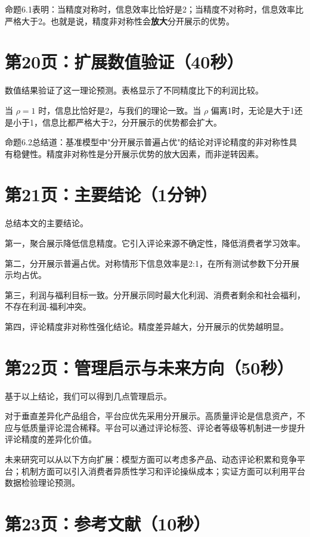 \documentclass[12pt,a4paper]{article}
\begin{document}
命题6.1表明：当精度对称时，信息效率比恰好是2；当精度不对称时，信息效率比严格大于2。也就是说，精度非对称性会\textbf{放大}分开展示的优势。

\section*{第20页：扩展数值验证（40秒）}

数值结果验证了这一理论预测。表格显示了不同精度比下的利润比较。

当 $\rho = 1$ 时，信息比恰好是2，与我们的理论一致。当 $\rho$ 偏离1时，无论是大于1还是小于1，信息比都严格大于2，分开展示的优势都会扩大。

命题6.2总结道：基准模型中"分开展示普遍占优"的结论对评论精度的非对称性具有稳健性。精度非对称性是分开展示优势的放大因素，而非逆转因素。

\section*{第21页：主要结论（1分钟）}

总结本文的主要结论。

第一，聚合展示降低信息精度。它引入评论来源不确定性，降低消费者学习效率。

第二，分开展示普遍占优。对称情形下信息效率是2:1，在所有测试参数下分开展示均占优。

第三，利润与福利目标一致。分开展示同时最大化利润、消费者剩余和社会福利，不存在利润-福利冲突。

第四，评论精度非对称性强化结论。精度差异越大，分开展示的优势越明显。

\section*{第22页：管理启示与未来方向（50秒）}

基于以上结论，我们可以得到几点管理启示。

对于垂直差异化产品组合，平台应优先采用分开展示。高质量评论是信息资产，不应与低质量评论混合稀释。平台可以通过评论标签、评论者等级等机制进一步提升评论精度的差异化价值。

未来研究可以从以下方向扩展：模型方面可以考虑多产品、动态评论积累和竞争平台；机制方面可以引入消费者异质性学习和评论操纵成本；实证方面可以利用平台数据检验理论预测。

\section*{第23页：参考文献（10秒）}
\end{document}
